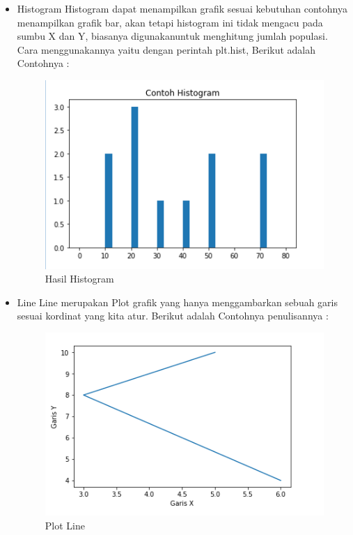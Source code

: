 \begin{itemize} 
    \item Histogram\newline
    Histogram dapat menampilkan grafik sesuai kebutuhan contohnya menampilkan grafik bar, akan tetapi histogram ini
    tidak mengacu pada sumbu X dan Y, biasanya digunakanuntuk menghitung jumlah populasi.\newline
    Cara menggunakannya yaitu dengan perintah plt.hist, Berikut adalah Contohnya :

    

\begin{figure}[h]
\centering
\includegraphics[scale=0.9]{figures/6/Teori/1174038/3.png}
\caption{Hasil Histogram}
\label{fig:contoh}
\end{figure}
\end{itemize}

\begin{itemize}
    \item Line\newline
    Line merupakan Plot grafik yang hanya menggambarkan sebuah garis sesuai kordinat yang kita atur.
    Berikut adalah Contohnya penulisannya :

    

\begin{figure}[h]
\centering
\includegraphics[scale=0.6]{figures/6/Teori/1174038/1.png}
\caption{Plot Line}
\label{fig:contoh}
\end{figure}
\end{itemize}

